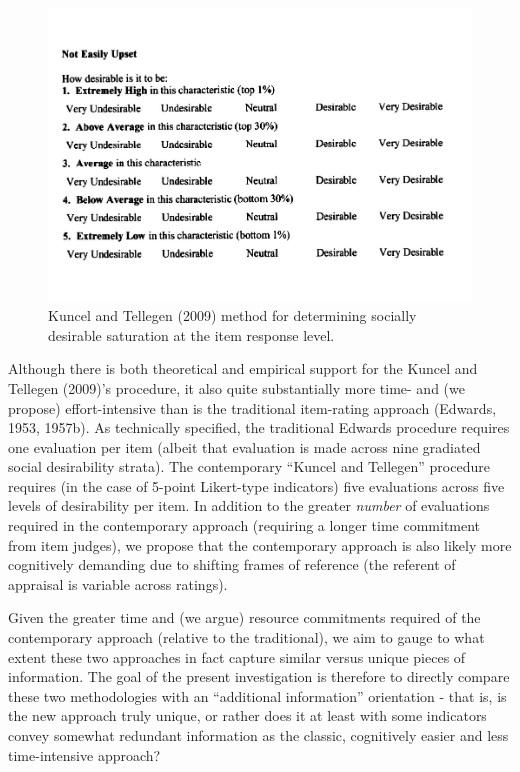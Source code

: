 \documentclass[
  ,jou]{apa6}
\begin{document}
\begin{figure}
\centering
\includegraphics{KuncelTellegen_files/figure-latex/Figure1-1.pdf}
\caption{\label{fig:Figure1}Kuncel and Tellegen (2009) method for determining socially desirable saturation at the item response level.}
\end{figure}

Although there is both theoretical and empirical support for the Kuncel and Tellegen (2009)'s procedure, it also quite substantially more time- and (we propose) effort-intensive than is the traditional item-rating approach (Edwards, 1953, 1957b). As technically specified, the traditional Edwards procedure requires one evaluation per item (albeit that evaluation is made across nine gradiated social desirability strata). The contemporary ``Kuncel and Tellegen'' procedure requires (in the case of 5-point Likert-type indicators) five evaluations across five levels of desirability per item. In addition to the greater \emph{number} of evaluations required in the contemporary approach (requiring a longer time commitment from item judges), we propose that the contemporary approach is also likely more cognitively demanding due to shifting frames of reference (the referent of appraisal is variable across ratings).

Given the greater time and (we argue) resource commitments required of the contemporary approach (relative to the traditional), we aim to gauge to what extent these two approaches in fact capture similar versus unique pieces of information. The goal of the present investigation is therefore to directly compare these two methodologies with an ``additional information'' orientation - that is, is the new approach truly unique, or rather does it at least with some indicators convey somewhat redundant information as the classic, cognitively easier and less time-intensive approach?
\end{document}
